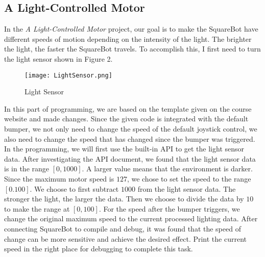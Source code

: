 \documentclass[12pt]{report}
\begin{document}
\subsection{A Light-Controlled Motor}
In the \textit{A Light-Controlled Motor} project, our goal is to make the SquareBot have different speeds of motion depending on the intensity of the light. The brighter the light, the faster the SquareBot travels. To accomplish this, I first need to turn the light sensor shown in Figure 2.
\begin{figure}[htbp]
	\centering
	\texttt{[image: LightSensor.png]}
	\caption{Light Sensor}
\end{figure}
In this part of programming, we are based on the template given on the course website and made changes. Since the given code is integrated with the default bumper, we not only need to change the speed of the default joystick control, we also need to change the speed that has changed since the bumper was triggered. In the programming, we will first use the built-in API to get the light sensor data. After investigating the API document, we found that the light sensor data is in the range $[0, 1000]$. A larger value means that the environment is darker. Since the maximum motor speed is $127$, we chose to set the speed to the range $[0.100]$. We choose to first subtract $1000$ from the light sensor data. The stronger the light, the larger the data. Then we choose to divide the data by $10$ to make the range at $[0,100]$. For the speed after the bumper triggers, we change the original maximum speed to the current processed lighting data. After connecting SquareBot to compile and debug, it was found that the speed of change can be more sensitive and achieve the desired effect. Print the current speed in the right place for debugging to complete this task.
\end{document}
